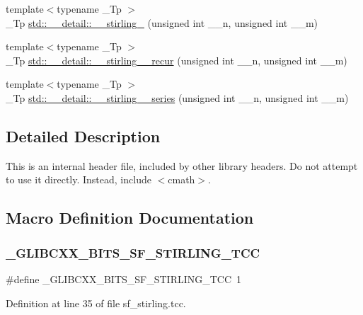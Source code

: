 \begin{DoxyCompactItemize}
\item 
{\footnotesize template$<$typename \+\_\+\+Tp $>$ }\\\+\_\+\+Tp \hyperlink{namespacestd_1_1____detail_a4589d459a7a9d1d9e19b33601238a4af}{std\+::\+\_\+\+\_\+detail\+::\+\_\+\+\_\+stirling\+\_} (unsigned int \+\_\+\+\_\+n, unsigned int \+\_\+\+\_\+m)
\item 
{\footnotesize template$<$typename \+\_\+\+Tp $>$ }\\\+\_\+\+Tp \hyperlink{namespacestd_1_1____detail_a23c6eb236cd8ddcfbe43e66ac23324db}{std\+::\+\_\+\+\_\+detail\+::\+\_\+\+\_\+stirling\+\_\+\_\+recur} (unsigned int \+\_\+\+\_\+n, unsigned int \+\_\+\+\_\+m)
\item 
{\footnotesize template$<$typename \+\_\+\+Tp $>$ }\\\+\_\+\+Tp \hyperlink{namespacestd_1_1____detail_a8408f17699eb43a14447c7e4795b277f}{std\+::\+\_\+\+\_\+detail\+::\+\_\+\+\_\+stirling\+\_\+\_\+series} (unsigned int \+\_\+\+\_\+n, unsigned int \+\_\+\+\_\+m)
\end{DoxyCompactItemize}


\subsection{Detailed Description}
This is an internal header file, included by other library headers. Do not attempt to use it directly. Instead, include $<$cmath$>$. 

\subsection{Macro Definition Documentation}
\mbox{\label{sf__stirling_8tcc_aa674f8ec509063cf88851a6ee6e72bc5}} 
\subsubsection{\texorpdfstring{\+\_\+\+G\+L\+I\+B\+C\+X\+X\+\_\+\+B\+I\+T\+S\+\_\+\+S\+F\+\_\+\+S\+T\+I\+R\+L\+I\+N\+G\+\_\+\+T\+CC}{\_GLIBCXX\_BITS\_SF\_STIRLING\_TCC}}
{\footnotesize\ttfamily \#define \+\_\+\+G\+L\+I\+B\+C\+X\+X\+\_\+\+B\+I\+T\+S\+\_\+\+S\+F\+\_\+\+S\+T\+I\+R\+L\+I\+N\+G\+\_\+\+T\+CC~1}



Definition at line 35 of file sf\+\_\+stirling.\+tcc.

